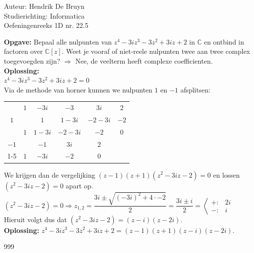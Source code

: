 \documentclass[a4paper]{article}
\begin{document}
  
\noindent \large Auteur: Hendrik De Bruyn \\
\noindent \large Studierichting: Informatica\\
\noindent \large Oefeningenreeks 1D nr. 22.5\\

\medskip

\normalsize

\textbf{Opgave: } Bepaal alle nulpunten van $z^4 -3iz^3 -3z^2 +3iz +2$ in $\mathbb{C}$ en ontbind in factoren over $\mathbb{C}[z]$. Weet je vooraf of niet-reele nulpunten twee aan twee complex toegevoegden zijn? $\Rightarrow$ Nee, de veelterm heeft complexe coefficienten. \\

\textbf{Oplossing: } \\

$z^4 -3iz^3 -3z^2 +3iz +2 = 0$\\

Via de methode van horner kunnen we nulpunten $1$ en $-1$ afsplitsen:

\begin{tabular}{c|ccccc}
	     & $1$ & $-3i$  & $-3$    & $3i$    & $2$ \\
	$1$  & $ $ & $1$    & $1-3i$  & $-2-3i$ & $-2$\\ \hline
	     & $1$ & $1-3i$ & $-2-3i$ & $-2$    & $0$ \\
	$-1$ &     & $-1$   & $3i$    & $2$ \\ \cline{1-5}
	     & $1$ & $-3i$  & $-2$    & $0$ \\
\end{tabular}

We krijgen dan de vergelijking $(z-1)(z+1)(z^2 -3iz -2) = 0$ en lossen $(z^2 -3iz -2) = 0$ apart op.\\

$(z^2 -3iz -2) = 0 \Rightarrow z_{1,2} = \dfrac{3i \pm \sqrt{(-3i)^2 + 4\cdot-2}}{2} = \dfrac{3i \pm i}{2} = \left<\begin{array}{ll}
	+: & 2i \\
	-: & i
\end{array}\right.$ \\

Hieruit volgt dus dat $(z^2 -3iz -2) = (z-i)(z-2i)$. \\

\textbf{Oplossing: } $z^4 -3iz^3 -3z^2 +3iz +2 = (z-1)(z+1)(z-i)(z-2i)$.

\begin{thebibliography}{999}
\end{thebibliography}
\end{document}
